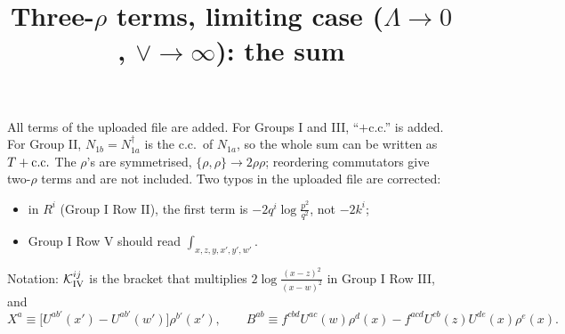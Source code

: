 \documentclass[9pt]{article}
\title{Three-$\rho$ terms, limiting case ($\Lambda\to 0$, $\vee\to \infty$): the sum}
\author{}
\date{}
\numberwithin{equation}{section}
\begin{document}
\maketitle
\noindent All terms of the uploaded file are added. For Groups I and III, ``$+$c.c.'' is added. For Group II, $N_{1b}=N_{1a}^{\dagger}$ is the c.c.\ of $N_{1a}$, so the whole sum can be written as $T+{\rm c.c.}$ The $\rho$'s are symmetrised, $\{\rho,\rho\}\to2\rho\rho$; reordering commutators give two-$\rho$ terms and are not included. Two typos in the uploaded file are corrected:
\begin{itemize}
\item in $R^{i}$ (Group I Row II), the first term is $-2q^{i}\log\frac{p^{2}}{q^{2}}$, not $-2k^{i}$;
\item Group I Row V should read $\int_{x,z,y,x',y',w'}$.
\end{itemize}
Notation: $\mathcal K^{ij}_{\rm IV}$ is the bracket that multiplies $2\log\frac{(x-z)^{2}}{(x-w)^{2}}$ in Group I Row III, and
\begin{equation}
X^{a}\equiv\big[U^{ab'}(x')-U^{ab'}(w')\big]\rho^{b'}(x'),\qquad
B^{ab}\equiv f^{cbd}U^{ac}(w)\rho^{d}(x)-f^{acd}U^{cb}(z)U^{de}(x)\rho^{e}(x).
\end{equation}
\end{document}
